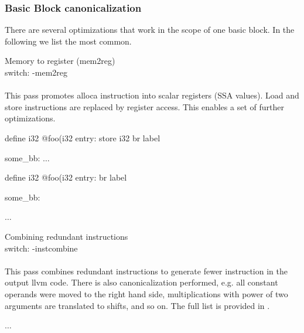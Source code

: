 \subsubsection{Basic Block canonicalization}

There are several optimizations that work in the scope of one basic block. In the following we list the most common.

\begin{description}
\item Memory to register (mem2reg)\\
switch: -mem2reg\\\\
This pass promotes alloca instruction into scalar registers (SSA values). Load and store instructions are replaced by register access. This enables a set of further optimizations.

\begin{minipage}{.45\textwidth}
\begin{llvmcode}[mathescape, caption={Before mem2reg}]
define i32 @foo(i32 %
entry:
  store i32 %
  br label %

some_bb:
$\dots$
\end{llvmcode}
\end{minipage}\hfill %
\begin{minipage}{.5\textwidth}
\begin{llvmcode}[mathescape, caption={After mem2reg}]
define i32 @foo(i32 %
entry:
  br label %

some_bb:
   
 
 
$\dots$
\end{llvmcode}
\end{minipage}

\item Combining redundant instructions\\
switch: -instcombine\\\\
This pass combines redundant instructions to generate fewer instruction in the output llvm code. There is also canonicalization performed, e.g. all constant operands were moved to the right hand side, multiplications with power of two arguments are translated to shifts, and so on. The full list is provided in \cite{bib:llvm_passes}.

\begin{minipage}{.45\textwidth}
\begin{llvmcode}[mathescape, caption={Before instcombine}]
$\dots$
\end{llvmcode}
\end{minipage}\hfill %
\begin{minipage}{.5\textwidth}
\begin{llvmcode}[mathescape, caption={After instcombine}]


\end{llvmcode}
\end{minipage}
\end{description}
